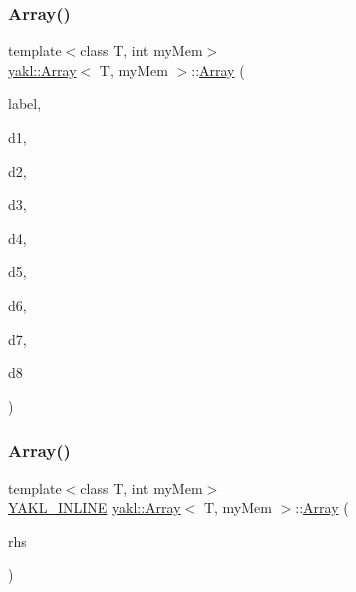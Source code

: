 \mbox{\label{classyakl_1_1Array_a7ea13d5b470c370686995998e2b671af}} 
\subsubsection{\texorpdfstring{Array()}{Array()}\hspace{0.1cm}{\footnotesize\ttfamily [10/12]}}
{\footnotesize\ttfamily template$<$class T, int my\+Mem$>$ \\
\hyperlink{classyakl_1_1Array}{yakl\+::\+Array}$<$ T, my\+Mem $>$\+::\hyperlink{classyakl_1_1Array}{Array} (\begin{DoxyParamCaption}\item[{char const $\ast$}]{label,  }\item[{size\+\_\+t const}]{d1,  }\item[{size\+\_\+t const}]{d2,  }\item[{size\+\_\+t const}]{d3,  }\item[{size\+\_\+t const}]{d4,  }\item[{size\+\_\+t const}]{d5,  }\item[{size\+\_\+t const}]{d6,  }\item[{size\+\_\+t const}]{d7,  }\item[{size\+\_\+t const}]{d8 }\end{DoxyParamCaption})\hspace{0.3cm}{\ttfamily [inline]}}

\mbox{\label{classyakl_1_1Array_aad63408156dbe13bd154110776ccf832}} 
\subsubsection{\texorpdfstring{Array()}{Array()}\hspace{0.1cm}{\footnotesize\ttfamily [11/12]}}
{\footnotesize\ttfamily template$<$class T, int my\+Mem$>$ \\
\hyperlink{YAKL_8h_aa0dd629ffce6d564b19e9313fb91a5ad}{Y\+A\+K\+L\+\_\+\+I\+N\+L\+I\+NE} \hyperlink{classyakl_1_1Array}{yakl\+::\+Array}$<$ T, my\+Mem $>$\+::\hyperlink{classyakl_1_1Array}{Array} (\begin{DoxyParamCaption}\item[{\hyperlink{classyakl_1_1Array}{Array}$<$ T, my\+Mem $>$ const \&}]{rhs }\end{DoxyParamCaption})\hspace{0.3cm}{\ttfamily [inline]}}

